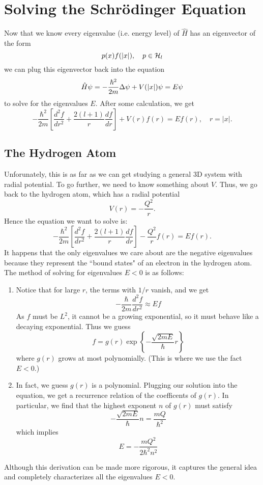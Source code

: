 \section{Solving the Schr\"{o}dinger Equation}
Now that we know every eigenvalue (i.e. energy level) of $\hat{H}$ has an eigenvector of the form
\[
    p(x)f(|x|), \quad p \in {\mathcal H}_l
\]
we can plug this eigenvector back into the equation
\[
    \hat{H}\psi = -\frac{\hbar^2}{2m}\Delta\psi + V(|x|)\psi = E\psi
\]
to solve for the eigenvalues $E$. After some calculation, we get
\[
    - \frac{\hbar^2}{2m}\left[ \frac{d^2f}{dr^2} + \frac{2(l+1)}{r} \frac{df}{dr} \right] + V(r)f(r) = Ef(r), \quad r = |x|.
\]
\subsection{The Hydrogen Atom}
Unforunately, this is as far as we can get studying a general 3D system with radial potential. To go further, we need to know something about $V$. Thus, we go back to the hydrogen atom, which has a radial potential
\[
    V(r) = - \frac{Q^2}{r}.
\]
Hence the equation we want to solve is:
\[
    - \frac{\hbar^2}{2m}\left[ \frac{d^2f}{dr^2} + \frac{2(l+1)}{r} \frac{df}{dr} \right] - \frac{Q^2}{r}f(r) = Ef(r).
\]
It happens that the only eigenvalues we care about are the negative eigenvalues because they represent the ``bound states" of an electron in the hydrogen atom. The method of solving for eigenvalues $E < 0$ is as follows:
\begin{enumerate}
    \item Notice that for large $r$, the terms with $1/r$ vanish, and we get
        \[
            - \frac{\hbar}{2m} \frac{d^2f}{dr^2} \approx Ef
        \]
        As $f$ must be $L^2$, it cannot be a growing exponential, so it must behave like a decaying exponential. Thus we guess
        \[
            f = g(r) \exp\left\{ - \frac{\sqrt{2mE}}{\hbar}r\right\}
        \]
        where $g(r)$ grows at most polynomially. (This is where we use the fact $E < 0$.)

    \item In fact, we guess $g(r)$ is a polynomial. Plugging our solution into the equation, we get a recurrence relation of the coefficents of $g(r)$. In particular, we find that the highest exponent $n$ of $g(r)$ must satisfy
        \[
            - \frac{\sqrt{2mE}}{\hbar} n = \frac{mQ}{\hbar^2}
        \]
        which implies
        \[
            E = - \frac{mQ^2}{2\hbar^2n^2}
        \]
\end{enumerate}
Although this derivation can be made more rigorous, it captures the general idea and completely characterizes all the eigenvalues $E < 0$.
